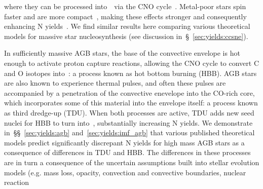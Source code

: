 \documentclass[ms.tex]{subfiles}
\begin{document}
where they can be processed into~\Nfourteen~via the CNO cycle~\citep{Heger2010,
Frischknecht2016, Andrews2017}.
Metal-poor stars spin faster and are more compact~\citep*{Maeder1999}, making
these effects stronger and consequently enhancing N yields~\citep*{Meynet2002a,
Meynet2002b, Meynet2006}.
We find similar results here comparing various theoretical models for massive
star nucleosynthesis (see discussion in~\S~\ref{sec:yields:ccsne}).
\par
In sufficiently massive AGB stars, the base of the convective envelope is hot
enough to activate proton capture reactions, allowing the CNO cycle to convert
C and O isotopes into~\Nfourteen: a process known as hot bottom burning (HBB).
AGB stars are also known to experience thermal pulses,
and often these pulses
are accompanied by a penetration of the convective enevelope into the
CO-rich core, which incorporates some of this material into the envelope
itself: a process known as third dredge-up (TDU).
When both processes are active, TDU adds new seed nuclei for HBB to turn
into~\Nfourteen, substantially increasing N yields.
We demonstrate in~\S\S~\ref{sec:yields:agb} and~\ref{sec:yields:imf_agb} that
various published theoretical models predict significantly discrepant N yields
for high mass AGB stars as a consequence of differences in TDU and
HBB.
The differences in these processes are in turn a consequence of the uncertain
assumptions built into stellar evolution models (e.g. mass
loss, opacity, convection and convective boundaries, nuclear reaction
\end{document}
